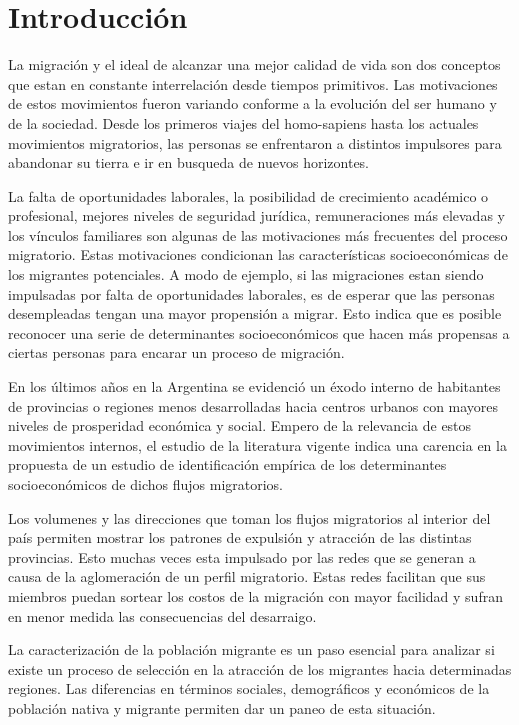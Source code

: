 \documentclass[12pt,a4paper]{article}
\begin{document}
\section{Introducción}

La migración y el ideal de alcanzar una mejor calidad de vida son dos conceptos que estan en constante interrelación desde tiempos primitivos. Las motivaciones de estos movimientos fueron variando conforme a la evolución del ser humano y de la sociedad. Desde los primeros viajes del homo-sapiens hasta los actuales movimientos migratorios, las personas se enfrentaron a distintos impulsores para abandonar su tierra e ir en busqueda de nuevos horizontes. 

La falta de oportunidades laborales, la posibilidad de crecimiento académico o profesional, mejores niveles de seguridad jurídica, remuneraciones más elevadas y los vínculos familiares son algunas de las motivaciones más frecuentes del proceso migratorio. Estas motivaciones condicionan las características socioeconómicas de los migrantes potenciales. A modo de ejemplo, si las migraciones estan siendo impulsadas por falta de oportunidades laborales, es de esperar que las personas desempleadas tengan una mayor propensión a migrar. Esto indica que es posible reconocer una serie de determinantes socioeconómicos que hacen más propensas a ciertas personas para encarar un proceso de migración. 

En los últimos años en la Argentina se evidenció un éxodo interno de habitantes de provincias o regiones menos desarrolladas hacia centros urbanos con mayores niveles de prosperidad económica y social. Empero de la relevancia de estos movimientos internos, el estudio de la literatura vigente indica una carencia en la propuesta de un estudio de identificación empírica de los determinantes socioeconómicos de dichos flujos migratorios.

Los volumenes y las direcciones que toman los flujos migratorios al interior del país permiten mostrar los patrones de expulsión y atracción de las distintas provincias. Esto muchas veces esta impulsado por las redes que se generan a causa de la aglomeración de un perfil migratorio. Estas redes facilitan que sus miembros puedan sortear los costos de la migración con mayor facilidad y sufran en menor medida las consecuencias del desarraigo.

La caracterización de la población migrante es un paso esencial para analizar si existe un proceso de selección en la atracción de los migrantes hacia determinadas regiones. Las diferencias en términos sociales, demográficos y económicos de la población nativa y migrante permiten dar un paneo de esta situación.
\end{document}
